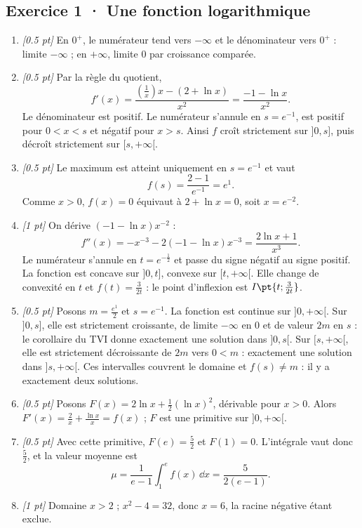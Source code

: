 \subsection*{Exercice 1 · Une fonction logarithmique}\begin{enumerate}

\item \textit{[\num{0,5} pt]} En $0^+$, le numérateur tend vers $-\infty$ et le dénominateur vers $0^+$ : limite $-\infty$ ; en $+\infty$, limite $0$ par croissance comparée.

\item \textit{[\num{0,5} pt]} Par la règle du quotient,
\[f'(x)=\frac{(\frac{1}{x})x-(2+\ln x)}{x^2}=\frac{-1-\ln x}{x^2}.\]
Le dénominateur est positif. Le numérateur s'annule en $s=e^{-1}$, est positif pour $0<x<s$ et négatif pour $x>s$. Ainsi $f$ croît strictement sur $]0,s]$, puis décroît strictement sur $[s,+\infty[$.

\item \textit{[\num{0,5} pt]} Le maximum est atteint uniquement en $s=e^{-1}$ et vaut
\[f(s)=\frac{2- 1}{e^{-1}}=e^{1}.\]
Comme $x>0$, $f(x)=0$ équivaut à $2+\ln x=0$, soit $x=e^{-2}$.

\item \textit{[1 pt]} On dérive $(-1-\ln x)x^{-2}$ :
\[f''(x)=-x^{-3}-2(-1-\ln x)x^{-3}=\frac{2\ln x+1}{x^3}.\]
Le numérateur s'annule en $t=e^{-\frac{1}{2}}$ et passe du signe négatif au signe positif. La fonction est concave sur $]0,t]$, convexe sur $[t,+\infty[$. Elle change de convexité en $t$ et $f(t)=\frac{3}{2t}$ : le point d'inflexion est $I\pt{t;\frac{3}{2t}}$.

\item \textit{[\num{0,5} pt]} Posons $m=\frac{e^{1}}{2}$ et $s=e^{-1}$. La fonction est continue sur $]0,+\infty[$. Sur $]0,s]$, elle est strictement croissante, de limite $-\infty$ en $0$ et de valeur $2m$ en $s$ : le corollaire du TVI donne exactement une solution dans $]0,s[$. Sur $[s,+\infty[$, elle est strictement décroissante de $2m$ vers $0<m$ : exactement une solution dans $]s,+\infty[$. Ces intervalles couvrent le domaine et $f(s)\ne m$ : il y a exactement deux solutions.

\item \textit{[\num{0,5} pt]} Posons $F(x)=2\ln x+\frac12(\ln x)^2$, dérivable pour $x>0$. Alors $F'(x)=\frac{2}{x}+\frac{\ln x}{x}=f(x)$ ; $F$ est une primitive sur $]0,+\infty[$.

\item \textit{[\num{0,5} pt]} Avec cette primitive, $F(e)=\frac{5}{2}$ et $F(1)=0$. L'intégrale vaut donc $\frac{5}{2}$, et la valeur moyenne est
\[\mu=\frac{1}{e-1}\int_1^e f(x)\,\dd x=\frac{5}{2(e-1)}.\]

\item \textit{[1 pt]} Domaine $x>2$ ; $x^2-4=32$, donc $x=6$, la racine négative étant exclue.

\end{enumerate}

